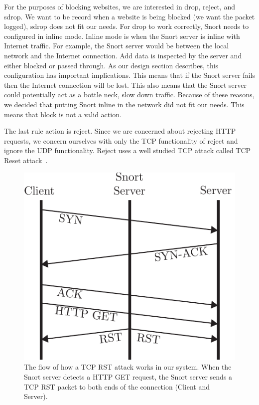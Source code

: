 For the purposes of blocking websites, we are interested in drop, reject, and
sdrop. We want to be record when a website is being blocked (we want the packet
logged), sdrop does not fit our needs. For drop to work correctly, Snort needs
to configured in inline mode. Inline mode is when the Snort server is inline
with Internet traffic. For example, the Snort server would be between the local
network and the Internet connection. Add data is inspected by the server and
either blocked or passed through. As our design section describes, this
configuration has important implications. This means that if the Snort server
fails then the Internet connection will be lost. This also means that the Snort
server could potentially act as a bottle neck, slow down traffic. Because of
these reasons, we decided that putting Snort inline in the network did not fit
our needs. This means that block is not a valid action.

The last rule action is reject. Since we are concerned about rejecting HTTP
requests, we concern ourselves with only the TCP functionality of reject and
ignore the UDP functionality. Reject uses a well studied TCP attack called TCP
Reset attack~\cite{XXX}.

\begin{figure}[!t]
    \centering
    \includegraphics[width=.8\columnwidth]{figures/tcp_reset}
    \caption{The flow of how a TCP RST attack works in our system. When the
    Snort server detects a HTTP GET request, the Snort server sends a TCP RST
    packet to both ends of the connection (Client and Server).}
    \label{fig:tcp_reset}
\end{figure}

